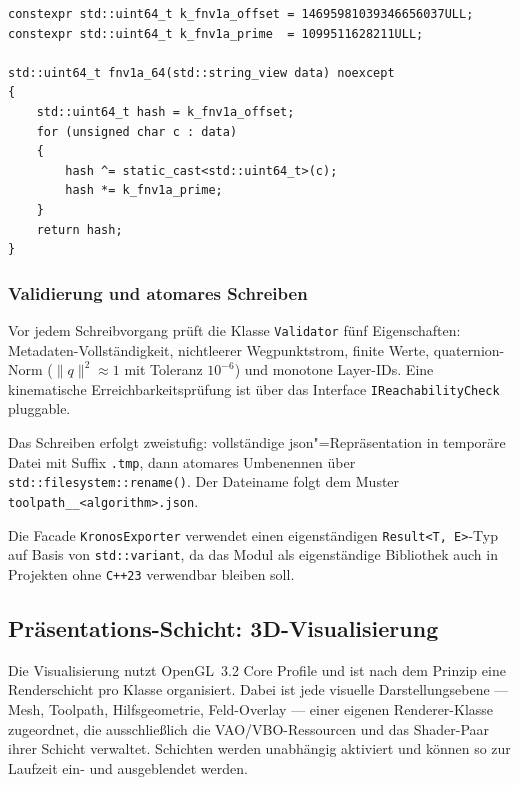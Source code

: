                 \begin{lstlisting}[style=cppStyle, caption={FNV-1a-64-Implementierung.}, label={lst:impl-medusa-fnv1a}]
constexpr std::uint64_t k_fnv1a_offset = 14695981039346656037ULL;
constexpr std::uint64_t k_fnv1a_prime  = 1099511628211ULL;

std::uint64_t fnv1a_64(std::string_view data) noexcept
{
    std::uint64_t hash = k_fnv1a_offset;
    for (unsigned char c : data)
    {
        hash ^= static_cast<std::uint64_t>(c);
        hash *= k_fnv1a_prime;
    }
    return hash;
}
                \end{lstlisting}

            \subsubsection{Validierung und atomares Schreiben}\label{subsubsec:impl-medusa-atomic-write} 
                Vor jedem Schreibvorgang prüft die Klasse \texttt{Validator} fünf Eigenschaften: Metadaten-Vollständigkeit, nichtleerer Wegpunktstrom, finite Werte, \gls{quaternion}-Norm ($\lVert q \rVert^2 \approx 1$ mit Toleranz $10^{-6}$) und monotone Layer-IDs.
                Eine kinematische Erreichbarkeitsprüfung ist über das Interface \texttt{IReachabilityCheck} pluggable.

                Das Schreiben erfolgt zweistufig: vollständige \gls{json}"=Repräsentation in temporäre Datei mit Suffix \texttt{.tmp}, dann atomares Umbenennen über \texttt{std::filesystem::rename()}.
                Der Dateiname folgt dem Muster \texttt{toolpath\_<UTC-Timestamp>\_<algorithm>.json}.

                Die Facade \texttt{KronosExporter} verwendet einen eigenständigen \texttt{Result<T, E>}-Typ auf Basis von \texttt{std::variant}, da das Modul als eigenständige Bibliothek auch in Projekten ohne \texttt{C++23} verwendbar bleiben soll.

        \subsection{Präsentations-Schicht: 3D-Visualisierung}\label{subsec:impl-medusa-graphics}
            Die Visualisierung nutzt \ac{OpenGL}~3.2 Core Profile und ist nach dem Prinzip \glqq eine Renderschicht pro Klasse\grqq{} organisiert.
            Dabei ist jede visuelle Darstellungsebene --- Mesh, Toolpath, Hilfsgeometrie, Feld-Overlay --- einer eigenen Renderer-Klasse zugeordnet, die ausschließlich die \ac{VAO}/\ac{VBO}-Ressourcen und das Shader-Paar ihrer Schicht verwaltet.
            Schichten werden unabhängig aktiviert und können so zur Laufzeit ein- und ausgeblendet werden.

